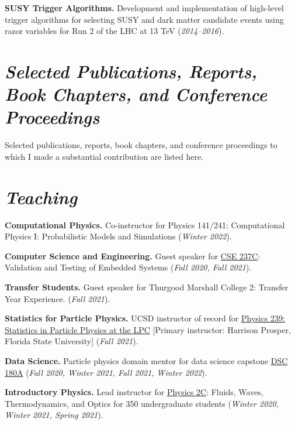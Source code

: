 \documentclass[11pt]{res}
\newcommand{\MarginText}[1]{\section{\textit{#1}}}
\begin{document}
\begin{resume}
{    \textbf{SUSY Trigger Algorithms.} Development and implementation of high-level trigger algorithms for selecting SUSY and dark matter candidate events using razor variables for Run 2 of the LHC at 13 TeV  (\textit{2014--2016}).

  }{}


  \MarginText{Selected Publications, Reports, Book Chapters, and Conference Proceedings}
  Selected publications, reports, book chapters, and conference proceedings to which I made a substantial contribution are listed here.\nocite{*}

  \vspace{11pt}
  \printbibliography[heading=none,sorting=ynt,keyword={career}]


  \MarginText{Teaching}

  \textbf{Computational Physics.} Co-instructor for Physics 141/241: Computational Physics I: Probabilistic Models and Simulations (\textit{Winter 2022}).

  \textbf{Computer Science and Engineering.} Guest speaker for \href{http://kastner.ucsd.edu/ryan/cse237c/}{CSE 237C}: Validation and Testing of Embedded Systems (\textit{Fall 2020, Fall 2021}).

  \textbf{Transfer Students.} Guest speaker for Thurgood Marshall College 2: Transfer Year Experience. (\textit{Fall 2021}).

  \textbf{Statistics for Particle Physics.} UCSD instructor of record for \href{https://indico.cern.ch/event/1066958/}{Physics 239: Statistics in Particle Physics at the LPC} [Primary instructor: Harrison Prosper, Florida State University] (\textit{Fall 2021}).

  \textbf{Data Science.} Particle physics domain mentor for data science capstone \href{https://jmduarte.github.io/capstone-particle-physics-domain}{DSC 180A} (\textit{Fall 2020, Winter 2021, Fall 2021, Winter 2022}).

  \textbf{Introductory Physics.} Lead instructor for \href{https://jduarte.physics.ucsd.edu/phys2c/index.html}{Physics 2C}: Fluids, Waves, Thermodynamics, and Optics for 350 undergraduate students (\textit{Winter 2020, Winter 2021, Spring 2021}).


\end{resume}
\end{document}
